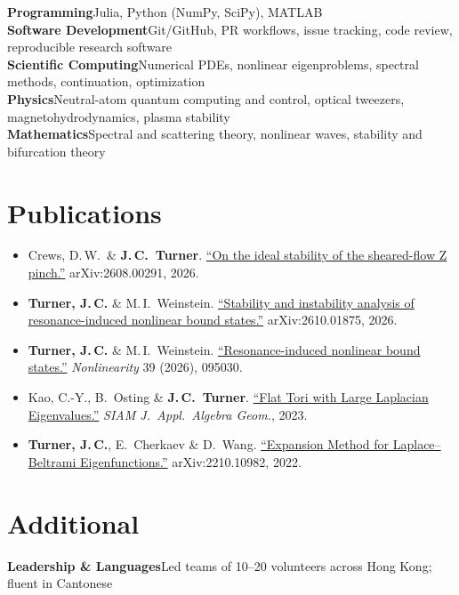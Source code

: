 \documentclass[10pt]{article}
\begin{document}
\textbf{Programming}\quad Julia, Python (NumPy, SciPy), MATLAB\\[3pt]
\textbf{Software Development}\quad Git/GitHub, PR workflows, issue tracking, code review, reproducible research software\\[3pt]
\textbf{Scientific Computing}\quad Numerical PDEs, nonlinear eigenproblems, spectral methods, continuation, optimization\\[3pt]
\textbf{Physics}\quad Neutral-atom quantum computing and control, optical tweezers, magnetohydrodynamics, plasma stability\\[3pt]
\textbf{Mathematics}\quad Spectral and scattering theory, nonlinear waves, stability and bifurcation theory
\vspace{2pt}
\section*{Publications}
{\small
\begin{itemize}[itemsep=3pt]
    \item Crews, D.\,W.\ \& \textbf{J.\,C.\ Turner}.
    \href{https://arxiv.org/abs/2608.00291}
    {``On the ideal stability of the sheared-flow Z pinch.''}
    arXiv:2608.00291, 2026.

    \item \textbf{Turner, J.\,C.} \& M.\,I.\ Weinstein.
    \href{https://arxiv.org/abs/2610.01875}
    {``Stability and instability analysis of resonance-induced nonlinear bound states.''}
    arXiv:2610.01875, 2026.

    \item \textbf{Turner, J.\,C.} \& M.\,I.\ Weinstein.
    \href{https://iopscience.iop.org/article/10.1088/1361-6544/ae9de1}
    {``Resonance-induced nonlinear bound states.''}
    \textit{Nonlinearity} 39 (2026), 095030.

    \item Kao, C.-Y., B.\ Osting \& \textbf{J.\,C.\ Turner}. 
    \href{https://epubs.siam.org/doi/10.1137/22M1478823}
    {``Flat Tori with Large Laplacian Eigenvalues.''} 
    \textit{SIAM J.\ Appl.\ Algebra Geom.}, 2023.

    \item \textbf{Turner, J.\,C.}, E.\ Cherkaev \& D.\ Wang. 
    \href{https://arxiv.org/abs/2210.10982}
    {``Expansion Method for Laplace--Beltrami Eigenfunctions.''} 
    arXiv:2210.10982, 2022.
\end{itemize}
}

\section*{Additional}
\textbf{Leadership \& Languages}\quad Led teams of 10--20 volunteers across Hong Kong; fluent in Cantonese
\end{document}
